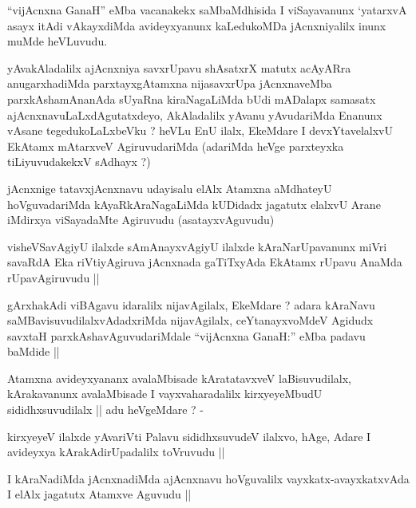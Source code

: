 \begin{artha}
``vijAcnxna GanaH'' eMba vacanakekx saMbaMdhisida I viSayavanunx
  `yatarxvA asayx itAdi vAkayxdiMda avideyxyanunx kaLedukoMDa
  jAcnxniyalilx inunx muMde heVLuvudu. 
\end{artha}


\begin{artha}
yAvakAladalilx ajAcnxniya savxrUpavu shAsatxrX matutx acAyARra
anugarxhadiMda parxtayxgAtamxna nijasavxrUpa jAcnxnaveMba
parxkAshamAnanAda sUyaRna kiraNagaLiMda bUdi mADalapx samasatx
ajAcnxnavuLaLxdAgutatxdeyo, AkAladalilx yAvanu yAvudariMda Enanunx
vAsane tegedukoLaLxbeVku ? heVLu EnU ilalx, EkeMdare I devxYtavelalxvU
EkAtamx mAtarxveV AgiruvudariMda (adariMda heVge parxteyxka
tiLiyuvudakekxV sAdhayx ?)
\end{artha}

\begin{artha}
jAcnxnige tatavxjAcnxnavu udayisalu elAlx Atamxna aMdhateyU
hoVguvadariMda kAyaRkAraNagaLiMda kUDidadx jagatutx elalxvU Arane
iMdirxya viSayadaMte Agiruvudu (asatayxvAguvudu)
\end{artha}

\begin{artha}
visheVSavAgiyU ilalxde sAmAnayxvAgiyU ilalxde kAraNarUpavanunx miVri
savaRdA Eka riVtiyAgiruva jAcnxnada gaTiTxyAda EkAtamx rUpavu AnaMda
rUpavAgiruvudu ||
\end{artha}

\begin{artha}
gArxhakAdi viBAgavu idaralilx nijavAgilalx, EkeMdare ? adara kAraNavu
saMBavisuvudilalxvAdadxriMda nijavAgilalx, ceYtanayxvoMdeV Agidudx
savxtaH parxkAshavAguvudariMdale ``vijAcnxna GanaH:'' eMba padavu
baMdide ||
\end{artha}

\begin{artha}
Atamxna avideyxyananx avalaMbisade kAratatavxveV laBisuvudilalx,
kArakavanunx avalaMbisade I vayxvaharadalilx kirxyeyeMbudU
sididhxsuvudilalx || adu heVgeMdare ? -
\end{artha}

\begin{artha}
kirxyeyeV ilalxde yAvariVti Palavu sididhxsuvudeV ilalxvo, hAge, Adare
I avideyxya kArakAdirUpadalilx toVruvudu ||
\end{artha}

\begin{artha}
I kAraNadiMda jAcnxnadiMda ajAcnxnavu hoVguvalilx
vayxkatx-avayxkatxvAda I elAlx jagatutx Atamxve Aguvudu ||
\end{artha}

